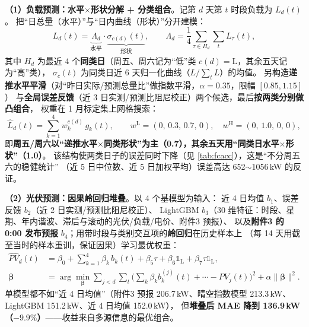 \documentclass[12pt,a4paper,fontset=fandol]{ctexart}
\begin{document}
\textbf{（1\nobreak）负载预测\nobreak：水平$\times$形状分解 + 分类组合}\nobreak。记第 $d$ 天第 $t$ 时段负载为 $L_d(t)$\nobreak。
把“日总量（水平\nobreak）\nobreak”与“日内曲线（形状\nobreak）\nobreak”分开建模\nobreak：
\begin{equation}
L_d(t)=\underbrace{\Lambda_d}_{\text{水平}}\cdot\underbrace{\sigma_{c(d)}(t)}_{\text{形状}},\qquad
\Lambda_d=\frac{1}{4}\sum_{\tau\in H_d}\sum_{t}L_\tau(t),
\label{eq:basisL}
\end{equation}
其中 $H_d$ 为最近 4 个\textbf{同类日}（周五\nobreak、周六记为“低\nobreak”类 $c(d)=\text{L}$\nobreak，其余五天记为“高\nobreak”类\nobreak）\nobreak，
$\sigma_{c}(t)$ 为同类日近 6 天归一化曲线（$L/\sum_tL$\nobreak）的均值\nobreak。
另构造\textbf{递推水平平滑}（对“昨日实际/预测总量比\nobreak”做指数平滑\nobreak，$\alpha=0.35$\nobreak，限幅 $[0.85,1.15]$\nobreak）
与\textbf{全局误差反馈}（近 3 日实测/预测比阻尼校正\nobreak）两个候选\nobreak，最后\textbf{按两类分别做凸组合}\nobreak，
权重在 1 月标定集上网格搜索\nobreak：
\begin{equation}
\hat L_d(t)=\sum_{k=1}^{4}w^{c(d)}_k\,g_k(t),\qquad
w^{\text{L}}=(0,\,0.3,\,0.7,\,0),\quad w^{\text{H}}=(0,\,1.0,\,0,\,0),
\label{eq:loadweights}
\end{equation}
即\textbf{周五/周六以“递推水平$\times$同类形状\nobreak”为主（0.7\nobreak）\nobreak，其余五天用“同类日水平$\times$形状\nobreak”（1.0\nobreak）}\nobreak。
该结构使两类日子的误差同时下降（见 \cref{tab:fcacc}\nobreak）\nobreak，这是“不分周五六的稳健统计\nobreak”
（近 5 日中位数\nobreak、近 5 日加权平均\nobreak）误差高达 652$\sim$1056\,kW 的反证\nobreak。

\textbf{（2\nobreak）光伏预测\nobreak：因果岭回归堆叠}\nobreak。以 4 个基模型为输入\nobreak：
近 4 日均值 $b_1$\nobreak、误差反馈 $b_2$（近 2 日实测/预测比阻尼校正\nobreak）\nobreak、
LightGBM $b_3$（30 维特征\nobreak：时段\nobreak、星期\nobreak、年内谐波\nobreak、滞后与滚动的光伏/负载/电价\nobreak、附件3 预报\nobreak）\nobreak、
以及\textbf{附件3 的 0:00 发布预报} $b_4$\nobreak；用带时段与类别交互项的\textbf{岭回归}在历史样本上
（每 14 天用截至当时的样本重训\nobreak，保证因果\nobreak）学习最优权重\nobreak：
\begin{equation}
\begin{aligned}
\widehat{PV}_d(t)&=\beta_0+\sum_{k=1}^{4}\beta_k\,b_k(t)+\beta_5\tau+\beta_6\mathbb{1}_{\text{L}}
+\beta_7\tau\mathbb{1}_{\text{L}},\\
\bm\beta&=\arg\min_{\bm\beta}\sum_{j<d}\sum_t\Big(\sum_k\beta_kb_k^{(j)}(t)+\cdots-PV_j(t)\Big)^2+\alpha\|\bm\beta\|^2 .
\end{aligned}
\label{eq:basisPV}
\end{equation}
单模型都不如“近 4 日均值\nobreak”（附件3 预报 206.7\,kW\nobreak、晴空指数模型 213.3\,kW\nobreak、
LightGBM 151.2\,kW\nobreak、近 4 日均值 152.0\,kW\nobreak）\nobreak，
但\textbf{堆叠后 MAE 降到 136.9\,kW（$-9.9\%$\nobreak）}——收益来自多源信息的最优组合\nobreak。
\end{document}
